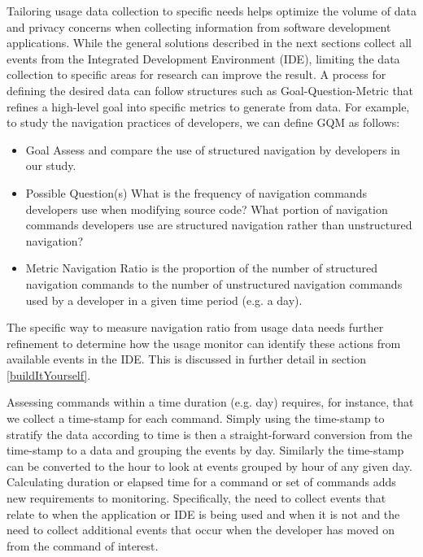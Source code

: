 Tailoring usage data collection to specific needs helps optimize the volume of data and privacy concerns when collecting information from software development applications.  While the general solutions described in the next sections collect all events from the Integrated Development Environment (IDE), limiting the data collection to specific areas for research can improve the result.  A process for defining the desired data can follow structures such as Goal-Question-Metric \cite{basili-GQM}  that refines a high-level goal into specific metrics to generate from data.  For example, to study the navigation practices of developers, we can define GQM as follows:
    \begin{itemize}
\item
	Goal
\subitem
	Assess and compare the use of structured navigation by developers in our study.
\item
	Possible Question(s)
\subitem
	What is the frequency of navigation commands developers use when modifying source code?
\subitem
	What portion of navigation commands developers use are structured navigation rather than unstructured navigation?
\item
	Metric
\subitem
	Navigation Ratio is the proportion of the number of structured navigation commands to the number of unstructured navigation commands used by a developer in a given time period (e.g. a day).

	    \end{itemize}

The specific way to measure navigation ratio from usage data needs further refinement to determine how the usage monitor can identify these actions from available events in the IDE. This is discussed in further detail in section \ref{buildItYourself}.

Assessing commands within a time duration (e.g. day) requires, for instance, that we collect a time-stamp for each command.  Simply using the time-stamp to stratify the data according to time is then a straight-forward conversion from the time-stamp to a data and grouping the events by day.
Similarly the time-stamp can be converted to the hour to look at events grouped by hour of any given day. Calculating duration or elapsed time for a command or set of commands adds new requirements to monitoring.  Specifically, the need to collect events that relate to when the application or IDE is being used and when it is not and the need to collect additional events that occur when the developer has moved on from the command of interest.

